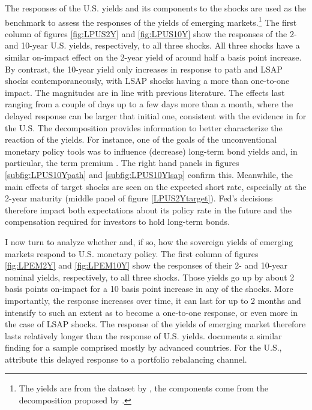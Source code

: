 {The responses of the U.S. yields and its components to the shocks are used as the benchmark to assess the responses of the yields of emerging markets.\footnote{ The yields are from the dataset by \cite{GSW:2007}, the components come from the decomposition proposed by \cite{KimWright:2005}.}
The first column of figures \ref{fig:LPUS2Y} and \ref{fig:LPUS10Y} show the responses of the 2- and 10-year U.S. yields, respectively, to all three shocks.
All three shocks have a similar on-impact effect on the 2-year yield of around half a basis point increase.
By contrast, the 10-year yield only increases in response to path and LSAP shocks contemporaneously, with LSAP shocks having a more than one-to-one impact.
The magnitudes are in line with previous literature.
The effects last ranging from a couple of days up to a few days more than a month, where the delayed response can be larger that initial one, consistent with the evidence in \cite{BrooksKatzLustig:2019} for the U.S.
The decomposition provides information to better characterize the reaction of the yields.
For instance, one of the goals of the unconventional monetary policy tools was to influence (decrease) long-term bond yields and, in particular, the term premium \citep{Kuttner:2018}.
The right hand panels in figures \ref{subfig:LPUS10Ypath} and \ref{subfig:LPUS10Ylsap} confirm this.
Meanwhile, the main effects of target shocks are seen on the expected short rate, especially at the 2-year maturity (middle panel of figure \ref{LPUS2Ytarget}).
Fed's decisions therefore impact both expectations about its policy rate in the future and the compensation required for investors to hold long-term bonds.

I now turn to analyze whether and, if so, how the sovereign yields of emerging markets respond to U.S. monetary policy.
The first column of figures \ref{fig:LPEM2Y} and \ref{fig:LPEM10Y} show the responses of their 2- and 10-year nominal yields, respectively, to all three shocks.
Those yields go up by about 2 basis points on-impact for a 10 basis point increase in any of the shocks.
More importantly, the response increases over time, it can last for up to 2 months and intensify to such an extent as to become a one-to-one response, or even more in the case of LSAP shocks.
The response of the yields of emerging market therefore lasts relatively longer than the response of U.S. yields.
\cite{ACDM:2019} documents a similar finding for a sample comprised mostly by advanced countries.
For the U.S., \cite{BrooksKatzLustig:2019} attribute this delayed response to a portfolio rebalancing channel.

}
